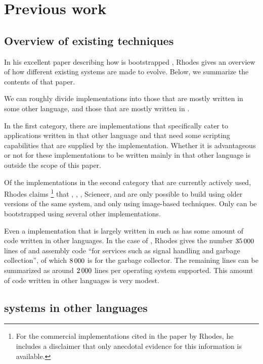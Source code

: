 \section{Previous work}

\subsection{Overview of existing techniques}

In his excellent paper describing how \sbcl{} is bootstrapped
\cite{Rhodes:2008:SSC:1482373.1482380}, Rhodes gives an overview of
how different existing \commonlisp{} systems are made to evolve.
Below, we summarize the contents of that paper.

We can roughly divide \commonlisp{} implementations into those that
are mostly written in some other language, and those that are mostly
written in \commonlisp{}.

In the first category, there are implementations that specifically
cater to applications written in that other language and that need
some scripting capabilities that are supplied by the \commonlisp{}
implementation.  Whether it is advantageous or not for these
implementations to be written mainly in that other language is outside
the scope of this paper.

Of the implementations in the second category that are currently
actively used, Rhodes claims%
\footnote{For the commercial \commonlisp{} implementations cited in
  the paper by Rhodes, he includes a disclaimer that only anecdotal
  evidence for this information is available.}
that \allegro{}, \lispworks{}, \cmucl{}, Scieneer, and \ccl{} are only
possible to build using older versions of the same system, and only
using image-based techniques.  Only \sbcl{} can be bootstrapped using
several other \commonlisp{} implementations.

Even a \commonlisp{} implementation that is largely written in
\commonlisp{} such as \sbcl{} has some amount of code written in other
languages.  In the case of \sbcl{}, Rhodes gives the number
$35\thinspace000$ lines of \clanguage{} and assembly code ``for
services such as signal handling and garbage collection'', of which
$8\thinspace000$ is for the garbage collector.  The remaining lines
can be summarized as around $2\thinspace000$ lines per operating
system supported.  This amount of code written in other languages is
very modest.

\subsection{\commonlisp{} systems in other languages}

